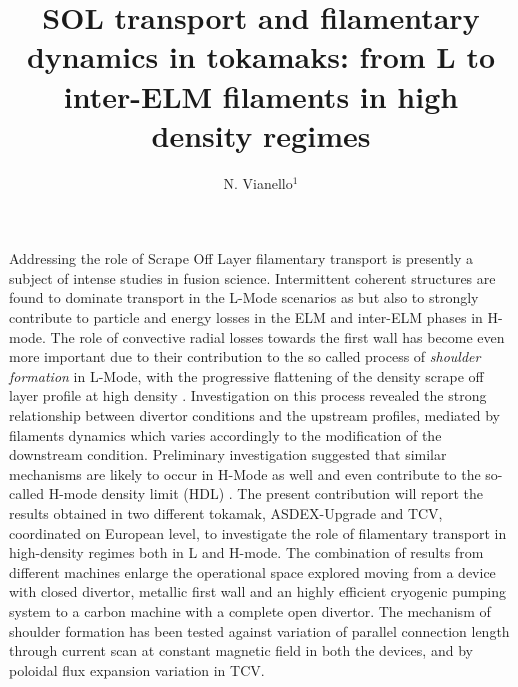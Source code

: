 \documentclass{epsconf}
\title{SOL transport and filamentary dynamics in tokamaks: from L to
  inter-ELM filaments in high density regimes}
\author{N. Vianello$^{1}$}
\institute{$^{1}$ Consorzio RFX (CNR, ENEA, INFN, Universit{\'a} di Padova, Acciaierie Venete SpA), C.so Stati Uniti 4, 35127, Padova, Italy}
\begin{document}
\maketitle
Addressing the role of Scrape Off Layer filamentary transport is
presently a subject of intense studies in fusion science. 
Intermittent coherent structures are found to dominate transport in
the L-Mode scenarios as but also to strongly contribute to particle
and energy losses in the ELM and inter-ELM phases in H-mode.
The role of convective radial losses towards the first
wall has become even more important due to their 
contribution 
to the so called process of \emph{shoulder formation} in
L-Mode, with the progressive flattening of the density
scrape off layer profile at high density
\cite{LaBombard:2001ks,Carralero:2015gu,Militello:2016hk,Vianello:2017ku}.
Investigation on this process revealed the strong
relationship between divertor conditions and the upstream profiles,
mediated by filaments dynamics which varies
accordingly to the modification of the downstream condition.
Preliminary investigation suggested that similar mechanisms are likely to
occur in H-Mode as well \cite{Carralero:2017gb} and even contribute to
the so-called H-mode density limit (HDL) \cite{bernert2014h}.  
The present contribution will report the results obtained in two
different tokamak, ASDEX-Upgrade and TCV,  coordinated on European
level, to investigate the role of filamentary transport in high-density
regimes both in L and H-mode. The combination 
of results from different machines enlarge the operational
space explored moving from a device with closed divertor,  metallic
first wall and an highly efficient cryogenic pumping system to a carbon
machine with a complete open divertor. The mechanism of shoulder
formation has been tested against variation of parallel connection
length through current scan at constant magnetic field in both the
devices, and by poloidal flux expansion variation in TCV. 

\begingroup
{}
\printbibliography
\endgroup
\end{document}
